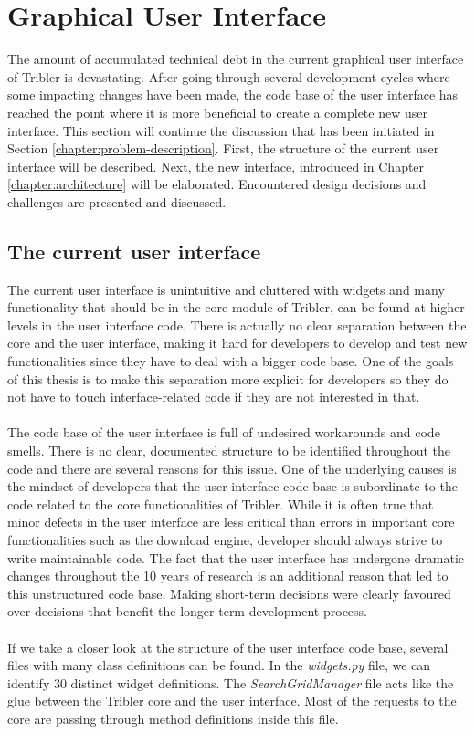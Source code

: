 \section{Graphical User Interface}
The amount of accumulated technical debt in the current graphical user interface of Tribler is devastating. After going through several development cycles where some impacting changes have been made, the code base of the user interface has reached the point where it is more beneficial to create a complete new user interface. This section will continue the discussion that has been initiated in Section \ref{chapter:problem-description}. First, the structure of the current user interface will be described. Next, the new interface, introduced in Chapter \ref{chapter:architecture} will be elaborated. Encountered design decisions and challenges are presented and discussed.

\subsection{The current user interface}
 The current user interface is unintuitive and cluttered with widgets and many functionality that should be in the core module of Tribler, can be found at higher levels in the user interface code. There is actually no clear separation between the core and the user interface, making it hard for developers to develop and test new functionalities since they have to deal with a bigger code base. One of the goals of this thesis is to make this separation more explicit for developers so they do not have to touch interface-related code if they are not interested in that.\\\\
The code base of the user interface is full of undesired workarounds and code smells. There is no clear, documented structure to be identified throughout the code and there are several reasons for this issue. One of the underlying causes is the mindset of developers that the user interface code base is subordinate to the code related to the core functionalities of Tribler. While it is often true that minor defects in the user interface are less critical than errors in important core functionalities such as the download engine, developer should always strive to write maintainable code. The fact that the user interface has undergone dramatic changes throughout the 10 years of research is an additional reason that led to this unstructured code base. Making short-term decisions were clearly favoured over decisions that benefit the longer-term development process.\\\\
If we take a closer look at the structure of the user interface code base, several files with many class definitions can be found. In the \emph{widgets.py} file, we can identify 30 distinct widget definitions. The \emph{SearchGridManager} file acts like the glue between the Tribler core and the user interface. Most of the requests to the core are passing through method definitions inside this file.

